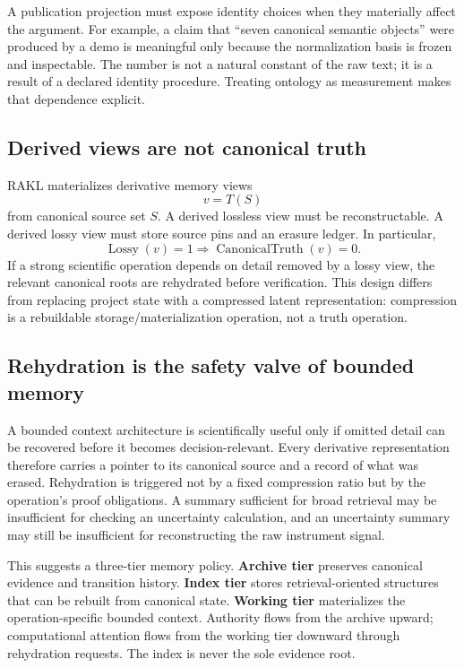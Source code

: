 A publication projection must expose identity choices when they materially affect the argument. For example, a claim that ``seven canonical semantic objects'' were produced by a demo is meaningful only because the normalization basis is frozen and inspectable. The number is not a natural constant of the raw text; it is a result of a declared identity procedure. Treating ontology as measurement makes that dependence explicit.

\subsection{Derived views are not canonical truth}
RAKL materializes derivative memory views
\begin{equation}v=T(S)
\end{equation}
from canonical source set $S$. A derived lossless view must be reconstructable. A derived lossy view must store source pins and an erasure ledger. In particular,
\begin{equation}\operatorname{Lossy}(v)=1\Rightarrow\operatorname{CanonicalTruth}(v)=0.
\end{equation}
If a strong scientific operation depends on detail removed by a lossy view, the relevant canonical roots are rehydrated before verification. This design differs from replacing project state with a compressed latent representation: compression is a rebuildable storage/materialization operation, not a truth operation.

\subsection{Rehydration is the safety valve of bounded memory}

A bounded context architecture is scientifically useful only if omitted detail can be recovered before it becomes decision-relevant. Every derivative representation therefore carries a pointer to its canonical source and a record of what was erased. Rehydration is triggered not by a fixed compression ratio but by the operation's proof obligations. A summary sufficient for broad retrieval may be insufficient for checking an uncertainty calculation, and an uncertainty summary may still be insufficient for reconstructing the raw instrument signal.

This suggests a three-tier memory policy. \textbf{Archive tier} preserves canonical evidence and transition history. \textbf{Index tier} stores retrieval-oriented structures that can be rebuilt from canonical state. \textbf{Working tier} materializes the operation-specific bounded context. Authority flows from the archive upward; computational attention flows from the working tier downward through rehydration requests. The index is never the sole evidence root.

